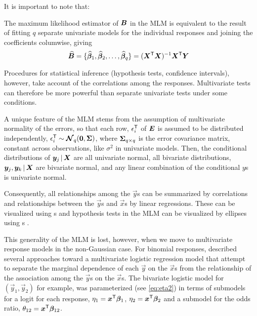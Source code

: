 \documentclass[11pt]{book}\usepackage[]{graphicx}\usepackage[]{color}
\begin{document}
It is important to note that:
\begin{itemize*}
  \item The maximum likelihood estimator of $\bm{B}$ in the MLM is equivalent to the result of fitting $q$ separate
  univariate models for the individual responses and joining the coefficients columwise, giving
\begin{equation*}
\widehat{\bm{B}} = \{ \widehat{\bm{\beta}}_1, \widehat{\bm{\beta}}_2, \dots , \widehat{\bm{\beta}}_q \}
                  = (\bm{X}^\mathsf{T} \bm{X})^{-1} \bm{X}^\mathsf{T} \bm{Y}
\end{equation*}
  \item Procedures for statistical inference (hypothesis tests, confidence intervals), however, take account of the correlations among the responses.  Multivariate tests can therefore be more powerful than separate univariate tests under
  some conditions.
  \item A unique feature of the MLM stems from the assumption of multivariate normality of the errors,
  so that
  each row, $\epsilon_i ^\mathsf{T}$ of $\bm{E}$ is assumed to be distributed independently,
  $ \epsilon_i ^\mathsf{T} \sim \bm{\mathcal{N}}_q (\bm{0}, \bm{\Sigma})$, where $\bm{\Sigma}_{q \times q}$
  is the error covariance matrix, constant across observations, like $\sigma^2$ in univariate models. 
  Then, the conditional distributions of $\bm{y}_j \, | \, \bm{X}$ are all
  univariate normal, all bivariate distributions, $\bm{y}_j, \bm{y}_k \, | \, \bm{X}$ are bivariate normal,
  and any linear combination of the conditional $y$s is univariate normal.
  
  \item Consequently, all relationships among the $\vec{y}$s can be summarized by correlations and relationships between
  the $\vec{y}$s and $\vec{x}$s by linear regressions.  These can be visualized using
  s \citep{Friendly-etal:ellipses:2013} and hypothesis tests in the MLM can be visualized
  by ellipses
  using s
  \citep{Friendly:07:manova,FoxFriendlyMonette:09:compstat}.  
\end{itemize*}

This generality of the MLM is lost, however, when we move to multivariate response models in the non-Gaussian case.
For binomial responses,  described several approaches toward a multivariate logistic
regression model that attempt to separate the marginal dependence of each $\vec{y}$ on the $\vec{x}$s
from the relationship of the association among the $\vec{y}$s on the $\vec{x}$s.
The bivariate logistic model for $(\vec{y}_1, \vec{y}_2)$ 
for example, was parameterized (see \eqref{eq:eta2}) in terms of submodels for a logit for each response, 
$\eta_1 = \bm{x}^\mathsf{T} \bm{\beta}_1$,
$\eta_2 = \bm{x}^\mathsf{T} \bm{\beta}_2$
and a submodel for the odds ratio,
$\theta_{12} = \bm{x}^\mathsf{T} \bm{\beta}_{12}$.
\end{document}
